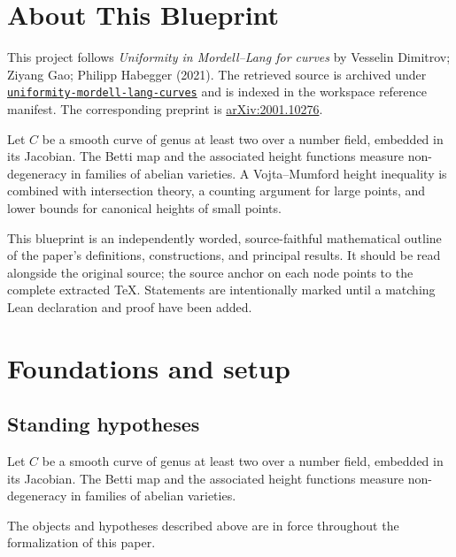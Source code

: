 

\chapter*{About This Blueprint}
\label{uniformity-mordell-lang-curves-about}

This project follows \emph{Uniformity in Mordell--Lang for curves} by Vesselin Dimitrov; Ziyang Gao; Philipp Habegger (2021). The
retrieved source is archived under
\href{../../../../../references/uniformity-mordell-lang-curves/}{\texttt{uniformity-mordell-lang-curves}} and is indexed in
the workspace reference manifest. The corresponding preprint is
\href{https://arxiv.org/abs/2001.10276}{arXiv:2001.10276}.

Let $C$ be a smooth curve of genus at least two over a number field, embedded in its Jacobian. The Betti map and the associated height functions measure non-degeneracy in families of abelian varieties. A Vojta--Mumford height inequality is combined with intersection theory, a counting argument for large points, and lower bounds for canonical heights of small points.

This blueprint is an independently worded, source-faithful mathematical
outline of the paper's definitions, constructions, and principal results. It
should be read alongside the original source; the source anchor on each node
points to the complete extracted TeX. Statements are intentionally marked
\notready until a matching Lean declaration and proof have been added.

\chapter{Foundations and setup}
\label{chap:uniformity-mordell-lang-curves-foundations}

\section{Standing hypotheses}
\label{sec:uniformity-mordell-lang-curves-standing}

Let $C$ be a smooth curve of genus at least two over a number field, embedded in its Jacobian. The Betti map and the associated height functions measure non-degeneracy in families of abelian varieties.

\begin{convention}
\label{uniformity-mordell-lang-curves-setup}
The objects and hypotheses described above are in force throughout the
formalization of this paper.
\notready
\end{convention}

